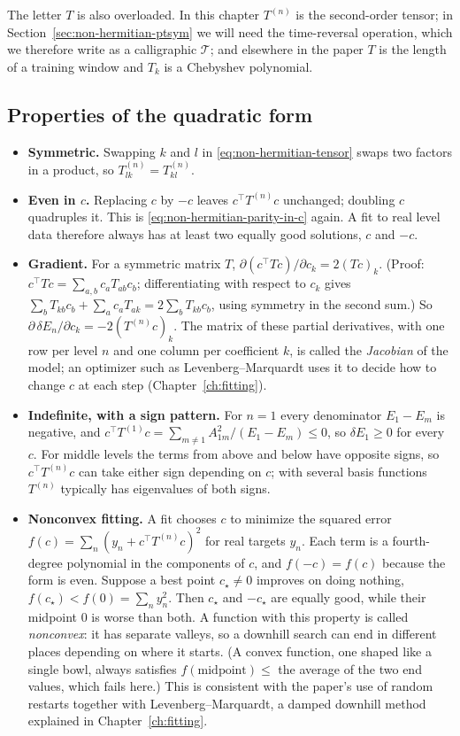 \begin{pitfall}
The letter $T$ is also overloaded. In this chapter $T^{(n)}$ is the second-order tensor; in Section~\ref{sec:non-hermitian-ptsym} we will need the time-reversal operation, which we therefore write as a calligraphic $\mathcal T$; and elsewhere in the paper $T$ is the length of a training window and $T_k$ is a Chebyshev polynomial.
\end{pitfall}

\subsection{Properties of the quadratic form}

\begin{itemize}
\item \textbf{Symmetric.} Swapping $k$ and $l$ in \eqref{eq:non-hermitian-tensor} swaps two factors in a product, so $T^{(n)}_{lk}=T^{(n)}_{kl}$.
\item \textbf{Even in $c$.} Replacing $c$ by $-c$ leaves $c^\top T^{(n)}c$ unchanged; doubling $c$ quadruples it. This is \eqref{eq:non-hermitian-parity-in-c} again. A fit to real level data therefore always has at least two equally good solutions, $c$ and $-c$.
\item \textbf{Gradient.} For a symmetric matrix $T$, $\partial(c^\top Tc)/\partial c_k = 2(Tc)_k$. (Proof: $c^\top Tc=\sum_{a,b}c_aT_{ab}c_b$; differentiating with respect to $c_k$ gives $\sum_bT_{kb}c_b+\sum_ac_aT_{ak} = 2\sum_b T_{kb}c_b$, using symmetry in the second sum.) So $\partial\,\delta E_n/\partial c_k = -2(T^{(n)}c)_k$. The matrix of these partial derivatives, with one row per level $n$ and one column per coefficient $k$, is called the \emph{Jacobian} of the model; an optimizer such as Levenberg--Marquardt uses it to decide how to change $c$ at each step (Chapter~\ref{ch:fitting}).
\item \textbf{Indefinite, with a sign pattern.} For $n=1$ every denominator $E_1-E_m$ is negative, and $c^\top T^{(1)}c = \sum_{m\ne1}A_{1m}^2/(E_1-E_m)\le0$, so $\delta E_1\ge0$ for every $c$. For middle levels the terms from above and below have opposite signs, so $c^\top T^{(n)}c$ can take either sign depending on $c$; with several basis functions $T^{(n)}$ typically has eigenvalues of both signs.
\item \textbf{Nonconvex fitting.} A fit chooses $c$ to minimize the squared error $f(c)=\sum_n(y_n+c^\top T^{(n)}c)^2$ for real targets $y_n$. Each term is a fourth-degree polynomial in the components of $c$, and $f(-c)=f(c)$ because the form is even. Suppose a best point $c_\star\ne0$ improves on doing nothing, $f(c_\star)<f(0)=\sum_ny_n^2$. Then $c_\star$ and $-c_\star$ are equally good, while their midpoint $0$ is worse than both. A function with this property is called \emph{nonconvex}: it has separate valleys, so a downhill search can end in different places depending on where it starts. (A convex function, one shaped like a single bowl, always satisfies $f(\text{midpoint})\le$ the average of the two end values, which fails here.) This is consistent with the paper's use of random restarts together with Levenberg--Marquardt, a damped downhill method explained in Chapter~\ref{ch:fitting}.
\end{itemize}


